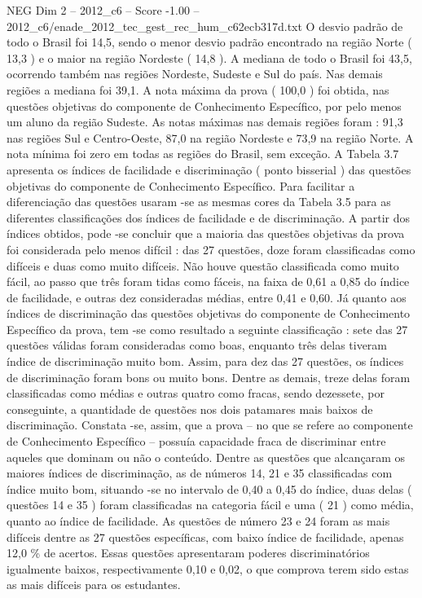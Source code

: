\begin{textsample}{NEG Dim 2 – 2012\_c6 – Score -1.00 – 2012\_c6/enade\_2012\_tec\_gest\_rec\_hum\_c62ecb317d.txt}
O desvio padrão de todo o Brasil foi 14,5, sendo o menor desvio padrão encontrado na região Norte ( 13,3 ) e o maior na região Nordeste ( 14,8 ).
A mediana de todo o Brasil foi 43,5, ocorrendo também nas regiões Nordeste, Sudeste e Sul do país.
Nas demais regiões a mediana foi 39,1.
A nota máxima da prova ( 100,0 ) foi obtida, nas questões objetivas do componente de Conhecimento Específico, por pelo menos um aluno da região Sudeste.
As notas máximas nas demais regiões foram : 91,3 nas regiões Sul e Centro-Oeste, 87,0 na região Nordeste e 73,9 na região Norte.
A nota mínima foi zero em todas as regiões do Brasil, sem exceção.
A Tabela 3.7 apresenta os índices de facilidade e discriminação ( ponto bisserial ) das questões objetivas do componente de Conhecimento Específico.
Para facilitar a diferenciação das questões usaram -se as mesmas cores da Tabela 3.5 para as diferentes classificações dos índices de facilidade e de discriminação.
A partir dos índices obtidos, pode -se concluir que a maioria das questões objetivas da prova foi considerada pelo menos difícil : das 27 questões, doze foram classificadas como difíceis e duas como muito difíceis.
Não houve questão classificada como muito fácil, ao passo que três foram tidas como fáceis, na faixa de 0,61 a 0,85 do índice de facilidade, e outras dez consideradas médias, entre 0,41 e 0,60.
Já quanto aos índices de discriminação das questões objetivas do componente de Conhecimento Específico da prova, tem -se como resultado a seguinte classificação : sete das 27 questões válidas foram consideradas como boas, enquanto três delas tiveram índice de discriminação muito bom.
Assim, para dez das 27 questões, os índices de discriminação foram bons ou muito bons.
Dentre as demais, treze delas foram classificadas como médias e outras quatro como fracas, sendo dezessete, por conseguinte, a quantidade de questões nos dois patamares mais baixos de discriminação.
Constata -se, assim, que a prova – no que se refere ao componente de Conhecimento Específico – possuía capacidade fraca de discriminar entre aqueles que dominam ou não o conteúdo.
Dentre as questões que alcançaram os maiores índices de discriminação, as de números 14, 21 e 35 classificadas com índice muito bom, situando -se no intervalo de 0,40 a 0,45 do índice, duas delas ( questões 14 e 35 ) foram classificadas na categoria fácil e uma ( 21 ) como média, quanto ao índice de facilidade.
As questões de número 23 e 24 foram as mais difíceis dentre as 27 questões específicas, com baixo índice de facilidade, apenas 12,0 \% de acertos.
Essas questões apresentaram poderes discriminatórios igualmente baixos, respectivamente 0,10 e 0,02, o que comprova terem sido estas as mais difíceis para os estudantes.

\end{textsample}
